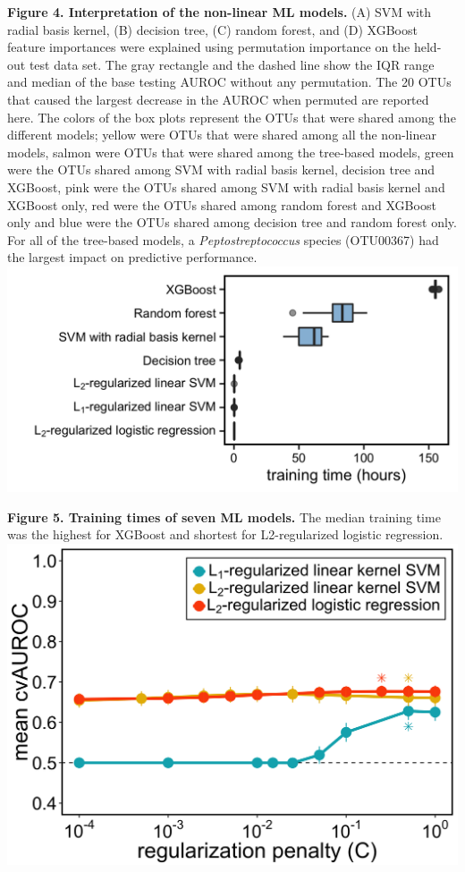 \documentclass[11pt,]{article}
\begin{document}
\textbf{Figure 4. Interpretation of the non-linear ML models.} (A) SVM
with radial basis kernel, (B) decision tree, (C) random forest, and (D)
XGBoost feature importances were explained using permutation importance
on the held-out test data set. The gray rectangle and the dashed line
show the IQR range and median of the base testing AUROC without any
permutation. The 20 OTUs that caused the largest decrease in the AUROC
when permuted are reported here. The colors of the box plots represent
the OTUs that were shared among the different models; yellow were OTUs
that were shared among all the non-linear models, salmon were OTUs that
were shared among the tree-based models, green were the OTUs shared
among SVM with radial basis kernel, decision tree and XGBoost, pink were
the OTUs shared among SVM with radial basis kernel and XGBoost only, red
were the OTUs shared among random forest and XGBoost only and blue were
the OTUs shared among decision tree and random forest only. For all of
the tree-based models, a \emph{Peptostreptococcus} species (OTU00367)
had the largest impact on predictive performance. \newpage
\includegraphics{Figure_5.png}

\textbf{Figure 5. Training times of seven ML models.} The median
training time was the highest for XGBoost and shortest for
L2-regularized logistic regression. \newpage
\includegraphics{Figure_S1.png}
\end{document}
